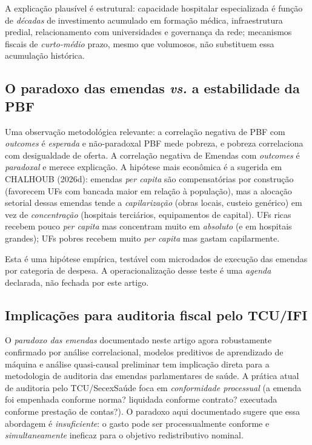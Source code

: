 \documentclass[12pt,a4paper,oneside]{article}
\begin{document}
A explicação plausível é estrutural: capacidade hospitalar
especializada é função de \textit{décadas} de investimento
acumulado em formação médica, infraestrutura predial,
relacionamento com universidades e governança da rede;
mecanismos fiscais de \textit{curto-médio} prazo, mesmo que
volumosos, não substituem essa acumulação histórica.

\subsection{O paradoxo das emendas \textit{vs.} a estabilidade
da PBF}

Uma observação metodológica relevante: a correlação negativa de
PBF com \textit{outcomes} é \textit{esperada} e não-paradoxal
\textemdash{} PBF mede pobreza, e pobreza correlaciona com
desigualdade de oferta. A correlação negativa de Emendas com
\textit{outcomes} é \textit{paradoxal} e merece explicação. A
hipótese mais econômica é a sugerida em CHALHOUB (2026d):
emendas \textit{per capita} são compensatórias por construção
(favorecem UFs com bancada maior em relação à população), mas a
alocação setorial dessas emendas tende a \textit{capilarização}
(obras locais, custeio genérico) em vez de \textit{concentração}
(hospitais terciários, equipamentos de capital). UFs ricas
recebem pouco \textit{per capita} mas concentram muito em
\textit{absoluto} (e em hospitais grandes); UFs pobres recebem
muito \textit{per capita} mas gastam capilarmente.

Esta é uma hipótese empírica, testável com microdados de
execução das emendas por categoria de despesa. A
operacionalização desse teste é uma \textit{agenda} declarada,
não fechada por este artigo.

\subsection{Implicações para auditoria fiscal pelo TCU/IFI}

O \textit{paradoxo das emendas} documentado neste artigo
\textemdash{} agora robustamente confirmado por análise
correlacional, modelos preditivos de aprendizado de máquina e
análise quasi-causal preliminar \textemdash{} tem implicação
direta para a metodologia de auditoria das emendas parlamentares
de saúde. A prática atual de auditoria pelo TCU/SecexSaúde
foca em \textit{conformidade processual} (a emenda foi
empenhada conforme norma? liquidada conforme contrato? executada
conforme prestação de contas?). O paradoxo aqui documentado
sugere que essa abordagem é \textit{insuficiente}: o gasto pode
ser processualmente conforme e \textit{simultaneamente} ineficaz
para o objetivo redistributivo nominal.
\end{document}
